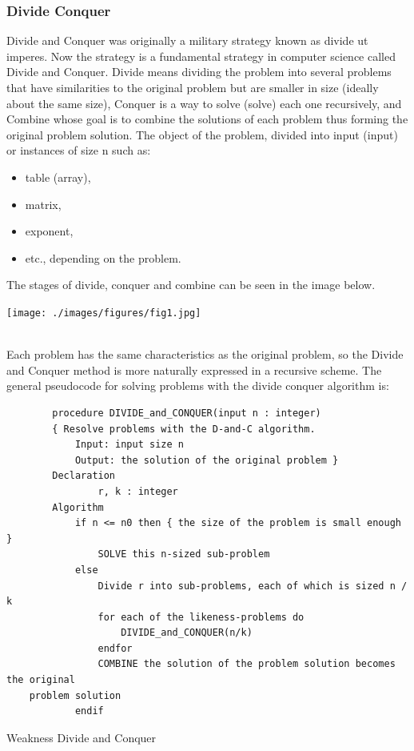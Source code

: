 \documentclass[12pt,titlepage]{article}
\begin{document}
\subsubsection{Divide Conquer}
Divide and Conquer was originally a military strategy known as divide ut imperes. Now the strategy is a fundamental strategy in computer science called Divide and Conquer. Divide means dividing the problem into several problems that have similarities to the original problem but are smaller in size (ideally about the same size), Conquer is a way to solve (solve) each one recursively, and Combine whose goal is to combine the solutions of each problem thus forming the original problem solution. The object of the problem, divided into input (input) or instances of size n such as:
\begin{itemize}
    \item table (array),
    \item matrix,
    \item exponent,
    \item etc., depending on the problem.
\end{itemize}
The stages of divide, conquer and combine can be seen in the image below.
\mbox{}\\
\begin{center}
    \texttt{[image: ./images/figures/fig1.jpg]}
\end{center}
\mbox{}\\
Each problem has the same characteristics as the original problem, so the Divide and Conquer method is more naturally expressed in a recursive scheme. The general pseudocode for solving problems with the divide conquer algorithm is:
\begin{verbatim}
        procedure DIVIDE_and_CONQUER(input n : integer)
        { Resolve problems with the D-and-C algorithm.
            Input: input size n
            Output: the solution of the original problem }
        Declaration
                r, k : integer
        Algorithm
            if n <= n0 then { the size of the problem is small enough }
                SOLVE this n-sized sub-problem
            else
                Divide r into sub-problems, each of which is sized n / k
                for each of the likeness-problems do
                    DIVIDE_and_CONQUER(n/k)
                endfor
                COMBINE the solution of the problem solution becomes the original
    problem solution
            endif

\end{verbatim}
Weakness Divide and Conquer
\end{document}
